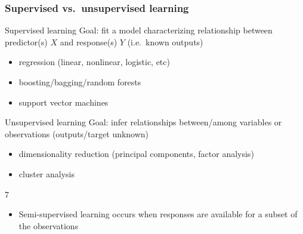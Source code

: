 \documentclass[usenames,dvipsnames,smaller]{beamer}
\newcommand{\?}{\stackrel{?}{=}}
\begin{document}
\begin{frame}
  \frametitle{Supervised vs.\ unsupervised learning}
  \pause
  \begin{minipage}[t]{.45\linewidth}
    \begin{block}{Supervised learning}
      Goal: fit a model characterizing relationship between predictor(s) $X$ and response(s) $Y$ (i.e.\ known outputs)
      \begin{itemize}
      \item regression (linear, nonlinear, logistic, etc)
      \item boosting/bagging/random forests
      \item support vector machines
      \end{itemize}
    \end{block}
  \end{minipage}
  \quad \pause
  \begin{minipage}[t]{.45\linewidth}
    \begin{block}{Unsupervised learning}
      Goal: infer relationships between/among variables or observations (outputs/target unknown)
      \begin{itemize}
      \item dimensionality reduction (principal components, factor analysis)
      \item cluster analysis
      \end{itemize}
    \end{block}
  \end{minipage}
7
  \bigskip
  \pause
  \begin{itemize}
  \item Semi-supervised learning occurs when responses are available for a subset of the observations
  \end{itemize}
\end{frame}
\end{document}
